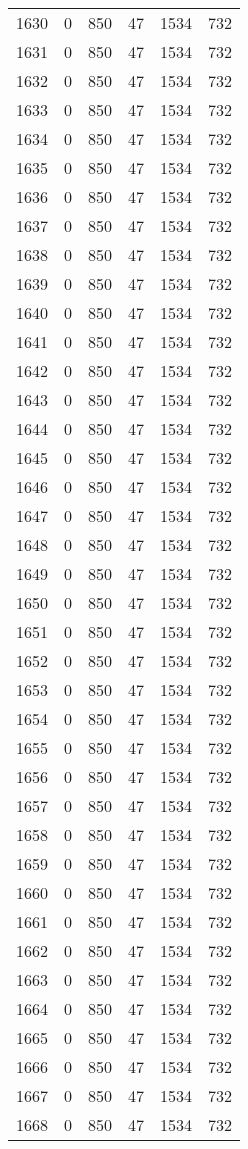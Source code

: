 \documentclass[a4paper]{ctexart}
\begin{document}
\begin{longtable}{p{1cm}|p{2cm}|p{2cm}|p{2cm}|P{2cm}|p{2cm}}
		1630&0&850&47&1534&732\\
		1631&0&850&47&1534&732\\
		1632&0&850&47&1534&732\\
		1633&0&850&47&1534&732\\
		1634&0&850&47&1534&732\\
		1635&0&850&47&1534&732\\
		1636&0&850&47&1534&732\\
		1637&0&850&47&1534&732\\
		1638&0&850&47&1534&732\\
		1639&0&850&47&1534&732\\
		1640&0&850&47&1534&732\\
		1641&0&850&47&1534&732\\
		1642&0&850&47&1534&732\\
		1643&0&850&47&1534&732\\
		1644&0&850&47&1534&732\\
		1645&0&850&47&1534&732\\
		1646&0&850&47&1534&732\\
		1647&0&850&47&1534&732\\
		1648&0&850&47&1534&732\\
		1649&0&850&47&1534&732\\
		1650&0&850&47&1534&732\\
		1651&0&850&47&1534&732\\
		1652&0&850&47&1534&732\\
		1653&0&850&47&1534&732\\
		1654&0&850&47&1534&732\\
		1655&0&850&47&1534&732\\
		1656&0&850&47&1534&732\\
		1657&0&850&47&1534&732\\
		1658&0&850&47&1534&732\\
		1659&0&850&47&1534&732\\
		1660&0&850&47&1534&732\\
		1661&0&850&47&1534&732\\
		1662&0&850&47&1534&732\\
		1663&0&850&47&1534&732\\
		1664&0&850&47&1534&732\\
		1665&0&850&47&1534&732\\
		1666&0&850&47&1534&732\\
		1667&0&850&47&1534&732\\
		1668&0&850&47&1534&732\\

\end{longtable}
\end{document}
